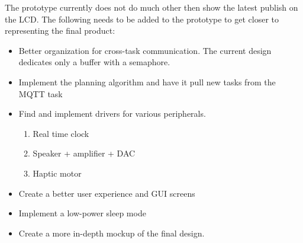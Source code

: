 The prototype currently does not do much other then show the latest publish on the LCD.
The following needs to be added to the prototype to get closer to representing the final product:

\begin{itemize}
  \item Better organization for cross-task communication. The current design dedicates only a buffer with a semaphore.
  \item Implement the planning algorithm and have it pull new tasks from the MQTT task
  \item Find and implement drivers for various peripherals.
  \begin{enumerate}
    \item Real time clock
    \item Speaker + amplifier + DAC
    \item Haptic motor
  \end{enumerate}
  \item Create a better user experience and GUI screens
  \item Implement a low-power sleep mode
  \item Create a more in-depth mockup of the final design.
\end{itemize}

